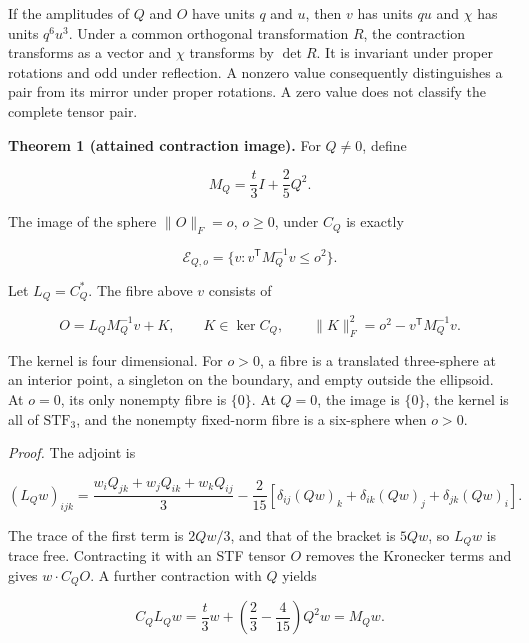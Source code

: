 \documentclass[aps,prd,reprint,onecolumn,11pt,nofootinbib,notitlepage]{revtex4-2}
\begin{document}
If the amplitudes of \(Q\) and \(O\) have units \(q\) and \(u\), then \(v\) has units \(qu\) and \(\chi\) has units \(q^6u^3\). Under a common orthogonal transformation \(R\), the contraction transforms as a vector and \(\chi\) transforms by \(\det R\). It is invariant under proper rotations and odd under reflection. A nonzero value consequently distinguishes a pair from its mirror under proper rotations. A zero value does not classify the complete tensor pair.

\textbf{Theorem 1 (attained contraction image).} For \(Q\ne0\), define

\begin{equation}
 M_Q=\frac t3 I+\frac25Q^2.
 \tag{3}
\end{equation}

The image of the sphere \(\|O\|_F=o\), \(o\ge0\), under \(C_Q\) is exactly

\begin{equation}
 \mathcal E_{Q,o}=\{v:v^{\mathsf T}M_Q^{-1}v\le o^2\}.
 \tag{4}
\end{equation}

Let \(L_Q=C_Q^*\). The fibre above \(v\) consists of

\begin{equation}
 O=L_QM_Q^{-1}v+K,\qquad K\in\ker C_Q,\qquad
 \|K\|_F^2=o^2-v^{\mathsf T}M_Q^{-1}v.
 \tag{5}
\end{equation}

The kernel is four dimensional. For \(o>0\), a fibre is a translated three-sphere at an interior point, a singleton on the boundary, and empty outside the ellipsoid. At \(o=0\), its only nonempty fibre is \(\{0\}\). At \(Q=0\), the image is \(\{0\}\), the kernel is all of \(\mathrm{STF}_3\), and the nonempty fixed-norm fibre is a six-sphere when \(o>0\).

\emph{Proof.} The adjoint is

\begin{equation}
 (L_Qw)_{ijk}
 =\frac{w_iQ_{jk}+w_jQ_{ik}+w_kQ_{ij}}3
 -\frac2{15}\left[\delta_{ij}(Qw)_k+
 \delta_{ik}(Qw)_j+\delta_{jk}(Qw)_i\right].
 \tag{6}
\end{equation}

The trace of the first term is \(2Qw/3\), and that of the bracket is \(5Qw\), so \(L_Qw\) is trace free. Contracting it with an STF tensor \(O\) removes the Kronecker terms and gives \(w\cdot C_QO\). A further contraction with \(Q\) yields

\begin{equation}
 C_QL_Qw=\frac t3w+\left(\frac23-\frac4{15}\right)Q^2w=M_Qw.
 \tag{7}
\end{equation}
\end{document}
